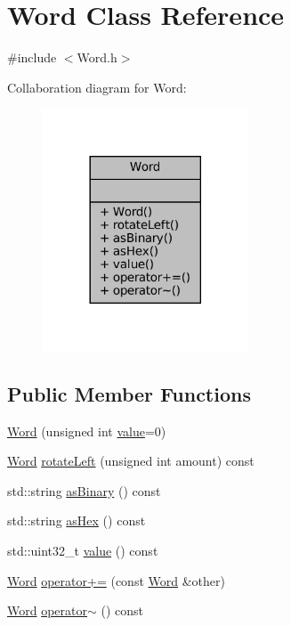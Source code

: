 \hypertarget{class_word}{}\section{Word Class Reference}
\label{class_word}


{\ttfamily \#include $<$Word.\+h$>$}



Collaboration diagram for Word\+:
\nopagebreak
\begin{figure}[H]
\begin{center}
\leavevmode
\includegraphics[width=173pt]{class_word__coll__graph}
\end{center}
\end{figure}
\subsection*{Public Member Functions}
\begin{DoxyCompactItemize}
\item 
\mbox{\hyperlink{class_word_a0576a5f8e54cdd41d7043adc310e2223}{Word}} (unsigned int \mbox{\hyperlink{class_word_a63a87cf461ab9d89ca0aba2e0800a9f2}{value}}=0)
\item 
\mbox{\hyperlink{class_word}{Word}} \mbox{\hyperlink{class_word_a8c4e85acb8c89c533086b56bfd31744e}{rotate\+Left}} (unsigned int amount) const
\item 
std\+::string \mbox{\hyperlink{class_word_ae8c5ed46c111c702ce9c9814fe870373}{as\+Binary}} () const
\item 
std\+::string \mbox{\hyperlink{class_word_a03edc78c8f1856c0b2765ae792dd3448}{as\+Hex}} () const
\item 
std\+::uint32\+\_\+t \mbox{\hyperlink{class_word_a63a87cf461ab9d89ca0aba2e0800a9f2}{value}} () const
\item 
\mbox{\hyperlink{class_word}{Word}} \mbox{\hyperlink{class_word_a1293142a4a807e4c08cbf8468b9cfb37}{operator+=}} (const \mbox{\hyperlink{class_word}{Word}} \&other)
\item 
\mbox{\hyperlink{class_word}{Word}} \mbox{\hyperlink{class_word_a666c7f1d06039b316b5ec48e905940e7}{operator$\sim$}} () const
\end{DoxyCompactItemize}


